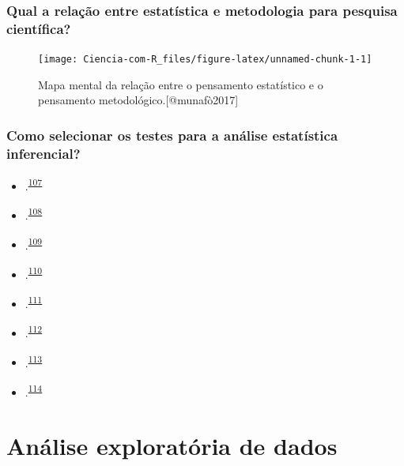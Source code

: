 \documentclass[
]{book}
\begin{document}
\hypertarget{qual-a-relauxe7uxe3o-entre-estatuxedstica-e-metodologia-para-pesquisa-cientuxedfica}{%
\subsection{Qual a relação entre estatística e metodologia para pesquisa científica?}\label{qual-a-relauxe7uxe3o-entre-estatuxedstica-e-metodologia-para-pesquisa-cientuxedfica}}

\begin{figure}

{\centering \texttt{[image: Ciencia-com-R\_files/figure-latex/unnamed-chunk-1-1]} 

}

\caption{Mapa mental da relação entre o pensamento estatístico e o pensamento metodológico.[@munafò2017]}\label{fig:unnamed-chunk-1}
\end{figure}

\hypertarget{como-selecionar-os-testes-para-a-anuxe1lise-estatuxedstica-inferencial}{%
\subsection{Como selecionar os testes para a análise estatística inferencial?}\label{como-selecionar-os-testes-para-a-anuxe1lise-estatuxedstica-inferencial}}

\begin{itemize}
\item
  .\textsuperscript{\protect\hyperlink{ref-dwivedi2019}{107}}
\item
  .\textsuperscript{\protect\hyperlink{ref-Dwivedi2022}{108}}
\item
  .\textsuperscript{\protect\hyperlink{ref-Kim2017}{109}}
\item
  .\textsuperscript{\protect\hyperlink{ref-marusteri2010}{110}}
\item
  .\textsuperscript{\protect\hyperlink{ref-mishra2019}{111}}
\item
  .\textsuperscript{\protect\hyperlink{ref-ray2021}{112}}
\item
  .\textsuperscript{\protect\hyperlink{ref-nayak2011}{113}}
\item
  .\textsuperscript{\protect\hyperlink{ref-shankar2014}{114}}
\end{itemize}

\hypertarget{analise-exploratoria-dados}{%
\chapter{\texorpdfstring{\textbf{Análise exploratória de dados}}{Análise exploratória de dados}}\label{analise-exploratoria-dados}}
\end{document}
